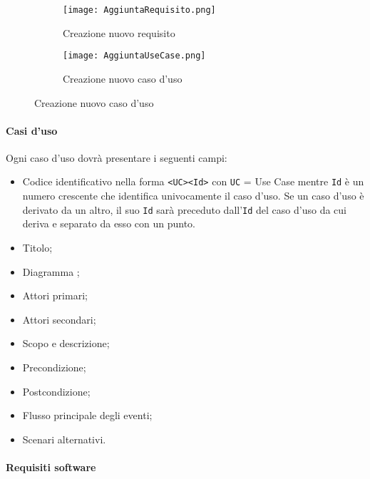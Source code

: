 \documentclass{scalatekids-article}
\begin{document}
\begin{figure}[H]
  \begin{subfigure}[H]{0.47\textwidth}
    \centering
    \texttt{[image: AggiuntaRequisito.png]}
    \caption{Creazione nuovo requisito}
  \end{subfigure}
  \qquad
  \begin{subfigure}[H]{0.47\textwidth}
    \centering
    \texttt{[image: AggiuntaUseCase.png]}
    \caption{Creazione nuovo caso d'uso}
  \end{subfigure}
\end{figure}

\paragraph{Casi d'uso}

Ogni caso d'uso dovrà presentare i seguenti campi:
\begin{itemize}
\item Codice identificativo nella forma \verb=<UC><Id>= con \verb=UC= = Use
  Case mentre \verb=Id= è un numero crescente che identifica univocamente il
  caso d'uso. Se un caso d'uso è derivato da un altro, il suo \verb=Id= sarà
  preceduto dall'\verb=Id= del caso d'uso da cui deriva e separato da esso con un
  punto.
\item Titolo;
\item Diagramma ;
\item Attori primari;
\item Attori secondari;
\item Scopo e descrizione;
\item Precondizione;
\item Postcondizione;
\item Flusso principale degli eventi;
\item Scenari alternativi.
\end{itemize}

\paragraph{Requisiti software}
\end{document}
